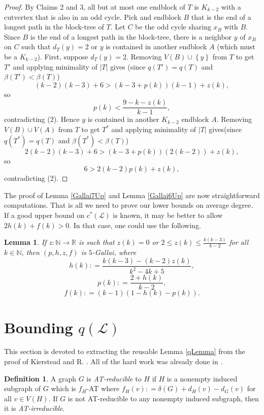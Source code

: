\documentclass[10pt]{article}
\theoremstyle{plain}
\newtheorem{lem}[thm]{Lemma}
\theoremstyle{definition}
\newtheorem{defn}{Definition}
\theoremstyle{remark}
\newcommand{\fancy}[1]{\mathcal{#1}}
\newcommand{\IN}{\mathbb{N}}
\newcommand{\IR}{\mathbb{R}}
\renewcommand{\L}{\fancy{L}}
\newcommand{\set}[1]{\left\{ #1 \right\}}
\newcommand{\card}[1]{\left|#1\right|}
\newcommand{\func}[3]{#1\colon #2 \rightarrow #3}
\newcommand{\parens}[1]{\left( #1 \right)}
\newcommand{\DefinedAs}{\mathrel{\mathop:}=}
\begin{document}
\begin{proof}
By Claims 2 and 3, all but at most one endblock of $T$ is $K_{k-2}$ with a cutvertex that is also in an odd cycle. 
Pick and endblock $B$ that is the end of a
longest path in the block-tree of $T$.  Let $C$ be the odd cycle sharing $x_B$ with $B$.  Since $B$ is the end of a longest path in the block-tree, there is
a neighbor $y$ of $x_B$ on $C$ such that $d_T(y) = 2$ or $y$ is contained in another endblock $A$ (which must be a $K_{k-2}$).  
First, suppose $d_T(y) = 2$.
Removing $V(B) \cup \set{y}$ from $T$ to get $T'$ and applying minimality of $\card{T}$ gives (since $q(T') = q(T)$ and $\beta(T') < \beta(T)$)
\[(k-2)(k-3) + 6 > \parens{k-3 + p(k)}\parens{k-1} + z(k),\]
so
\[p(k) < \frac{9-k-z(k)}{k-1},\]
contradicting (2).
Hence $y$ is contained in another $K_{k-2}$ endblock $A$.  Removing $V(B) \cup V(A)$ from $T$ to get $T^*$ and applying minimality of $\card{T}$ gives(since $q(T^*) = q(T)$ and $\beta(T^*) < \beta(T)$)
\[2(k-2)(k-3) + 6 > \parens{k-3 + p(k)}\parens{2(k-2)} + z(k),\]
so
\[6 > 2(k-2)p(k) + z(k),\]
contradicting (2).
\end{proof}

The proof of Lemma \ref{Gallai7Up} and Lemma \ref{Gallai6Up} are now straightforward computations.  
That is all we need to prove our lower bounds on average degree. If a good upper bound on $c^*(\L)$ is known, it may be better to allow $2h(k) + f(k) > 0$.
In that case, one could use the following.

\begin{lem}
If $\func{z}{\IN}{\IR}$ is such that $z(k) = 0$ or $2 \le z(k) \le \frac{k(k-3)}{k-2}$  for all $k \in \IN$, then 
$(p,h,z,f)$ is $5$-Gallai, where
\[h(k) \DefinedAs \frac{k(k-3) - (k-2)z(k)}{k^2-4k+5},\]
\[p(k) \DefinedAs \frac{2 + h(k)}{k-2},\]
\[f(k) \DefinedAs (k-1)(1 - h(k) - p(k)).\]
\end{lem}
\section{Bounding $q(\L)$}
This section is devoted to extracting the reusable Lemma \ref{qLemma} from the proof of Kierstead and R. \cite{OreVizing}.
All of the hard work was already done in \cite{OreVizing}.

\begin{defn}
	A graph $G$ is \emph{AT-reducible} to $H$ if $H$ is a nonempty induced subgraph of $G$ which is $f_H$-AT where $f_H(v) \DefinedAs \delta(G) + d_H(v) - d_G(v)$ for all $v \in V(H)$.  
	If $G$ is not AT-reducible to any nonempty induced subgraph, then it is \emph{AT-irreducible}.
\end{defn}
\end{document}
